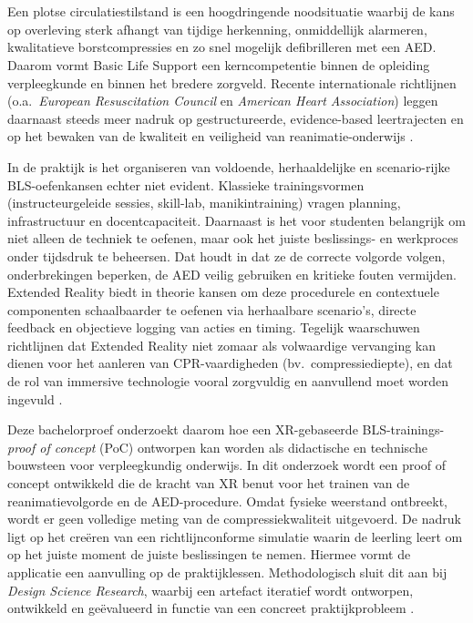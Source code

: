 
\chapter{}%
\label{ch:inleiding}

Een plotse circulatiestilstand is een hoogdringende noodsituatie waarbij de kans op overleving sterk afhangt van tijdige herkenning, onmiddellijk alarmeren, kwalitatieve borstcompressies en zo snel mogelijk defibrilleren met een AED.
Daarom vormt Basic Life Support een kerncompetentie binnen de opleiding verpleegkunde en binnen het bredere zorgveld.
Recente internationale richtlijnen (o.a.\ \emph{European Resuscitation Council} en \emph{American Heart Association}) leggen daarnaast steeds meer nadruk op gestructureerde, evidence-based leertrajecten en op het bewaken van de kwaliteit en veiligheid van reanimatie-onderwijs \autocite{ERC2025BLS,AHA2025Guidelines}.
%

In de praktijk is het organiseren van voldoende, herhaaldelijke en scenario-rijke BLS-oefenkansen echter niet evident.
Klassieke trainingsvormen (instructeurgeleide sessies, skill-lab, manikintraining) vragen planning, infrastructuur en docentcapaciteit.
Daarnaast is het voor studenten belangrijk om niet alleen de techniek te oefenen, maar ook het juiste beslissings- en werkproces onder tijdsdruk te beheersen. Dat houdt in dat ze de correcte volgorde volgen, onderbrekingen beperken, de AED veilig gebruiken en kritieke fouten vermijden.
Extended Reality biedt in theorie kansen om deze procedurele en contextuele componenten schaalbaarder te oefenen via herhaalbare scenario’s, directe feedback en objectieve logging van acties en timing.
Tegelijk waarschuwen richtlijnen dat Extended Reality niet zomaar als volwaardige vervanging kan dienen voor het aanleren van CPR-vaardigheden (bv.\ compressiediepte), en dat de rol van immersive technologie vooral zorgvuldig en aanvullend moet worden ingevuld \autocite{AHA2025Guidelines,ILCOR2023Immersive}.

Deze bachelorproef onderzoekt daarom hoe een XR-gebaseerde BLS-trainings-\emph{proof of concept} (PoC) ontworpen kan worden als didactische en technische bouwsteen voor verpleegkundig onderwijs.
In dit onderzoek wordt een proof of concept ontwikkeld die de kracht van XR benut voor het trainen van de reanimatievolgorde en de AED-procedure. Omdat fysieke weerstand ontbreekt, wordt er geen volledige meting van de compressiekwaliteit uitgevoerd. De nadruk ligt op het creëren van een richtlijnconforme simulatie waarin de leerling leert om op het juiste moment de juiste beslissingen te nemen. Hiermee vormt de applicatie een aanvulling op de praktijklessen.
Methodologisch sluit dit aan bij \emph{Design Science Research}, waarbij een artefact iteratief wordt ontworpen, ontwikkeld en geëvalueerd in functie van een concreet praktijkprobleem \autocite{Peffers2007,Hevner2004}.

